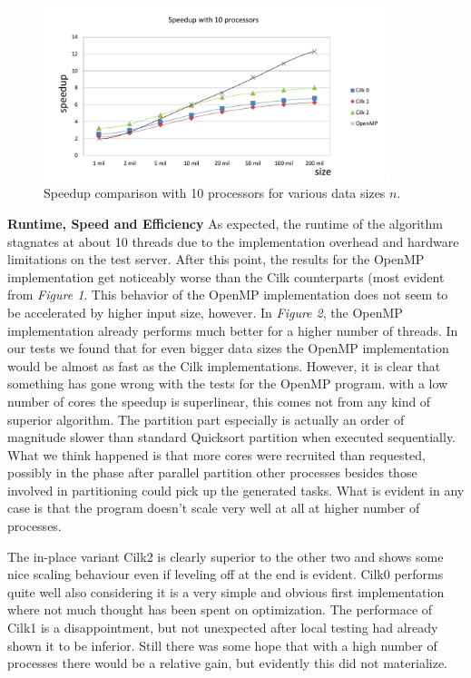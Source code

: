 \documentclass[12pt,a4paper]{article}
\begin{document}
\begin{figure}[h]
	\includegraphics[width=0.9\textwidth]{img/omp_cilk_speedup_10p.pdf}
	\caption{Speedup comparison with 10 processors for various data sizes $n$.}
\end{figure}

\noindent\textbf{Runtime, Speed and Efficiency}\newline
As expected, the runtime of the algorithm stagnates at about 10 threads due to the implementation overhead and hardware limitations on the test server. After this point, the results for the OpenMP implementation get noticeably worse than the Cilk counterparts (most evident from \emph{Figure 1}. This behavior of the OpenMP implementation does not seem to be accelerated by higher input size, however. In \emph{Figure 2}, the OpenMP implementation already performs much better for a higher number of threads. In our tests we found that for even bigger data sizes the OpenMP implementation would be almost as fast as the Cilk implementations. However, it is clear that something has gone wrong with the tests for the OpenMP program. with a low number of cores the speedup is superlinear, this comes not from any kind of superior algorithm. The partition part especially is actually an order of magnitude slower than standard Quicksort partition when executed sequentially. What we think happened is that more cores were recruited than requested, possibly in the phase after parallel partition other processes besides those involved in partitioning could pick up the generated tasks. What is evident in any case is that the program doesn't scale very well at all at higher number of processes.

The in-place variant Cilk2 is clearly superior to the other two and shows some nice scaling behaviour even if leveling off at the end is evident. Cilk0 performs quite well also considering it is a very simple and obvious first implementation where not much thought has been spent on optimization. The performace of Cilk1 is a disappointment, but not unexpected after local testing had already shown it to be inferior. Still there was some hope that with a high number of processes there would be a relative gain, but evidently this did not materialize.
\end{document}

